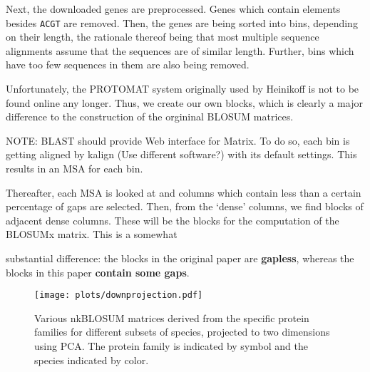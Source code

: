 \documentclass{article}
\begin{document}
\begin{multicols}{2}
Next, the downloaded genes are preprocessed. Genes which contain elements
besides \texttt{ACGT} are removed. Then, the genes are being sorted into bins,
depending on their length, the rationale thereof being that most multiple
sequence alignments assume that the sequences are of similar length. Further,
bins which have too few sequences in them are also being removed.

Unfortunately, the PROTOMAT system originally used by Heinikoff is not to be
found online any longer. Thus, we create our own blocks, which is clearly a
major difference to the construction of the orgininal BLOSUM matrices.

NOTE: BLAST should provide Web interface for Matrix.
To do so, each bin is getting aligned by kalign (Use different software?) with
its default settings. This results in an MSA for each bin.

Thereafter, each MSA is looked at and columns which contain less than a certain
percentage of gaps are selected. Then, from the `dense' columns, we find blocks
of adjacent dense columns. These will be the blocks for the computation of the
BLOSUMx matrix. This is a somewhat

substantial difference: the blocks in the original paper are \textbf{gapless},
whereas the blocks in this paper \textbf{contain some gaps}.

\end{multicols}

\begin{figure}
	\centering
\texttt{[image: plots/downprojection.pdf]}
	\caption{Various nkBLOSUM matrices derived from the specific protein families for different subsets of species, projected to two dimensions using PCA. The protein family is indicated by symbol and the species indicated by color.}
\end{figure}


\printbibliography
\end{document}

